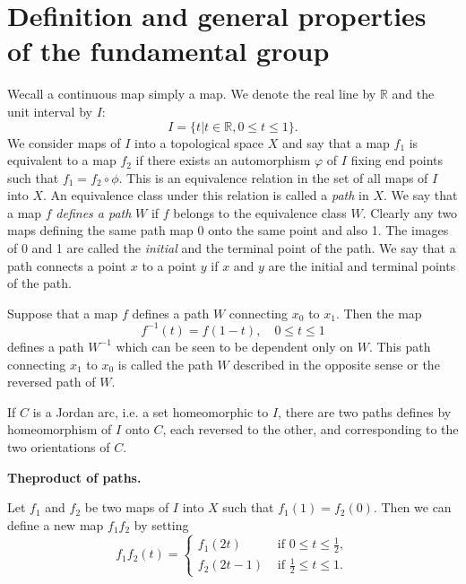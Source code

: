 \section{Definition and general properties of the fundamental
  group}\label{sec1} %

We\pageoriginale call a continuous map simply a map. We denote the
real line by $\mathbb{R}$ and the unit interval by $I$:  
$$
I= \{t|t \in \mathbb{R}, 0 \leq t \leq 1\}.
$$
We consider maps of $I$ into a topological space $X$ and say that a
map $f_1$ is equivalent to a map $f_2$ if there exists an automorphism
$\varphi$ of $I$ fixing end points such that $f_1=f_2 \circ  \phi$. This is an
equivalence relation in the set of all maps of $I$ into $X$. An
equivalence class under this relation is called a \textit{path} in
$X$. We say that a map $f$ \textit{defines a path} $W$ if $f$ belongs
to the equivalence class $W$. Clearly any two maps defining the same
path map 0 onto the same point and also 1. The images of 0 and 1
are called the \textit{initial} and the terminal point of the path. We
say that a path connects a point $x$ to a point $y$ if $x$ and $y$
are the initial and terminal points of the path. 

Suppose that a map $f$ defines a path $W$ connecting  $x_0$ to
$x_1$. Then the map 
$$
f^{-1}(t) = f(1-t),  \quad 0 \leq t \leq 1  
$$
defines a path $W^{-1}$ which can be seen to be dependent only on
$W$. This path connecting $x_1$ to $x_0$ is called the path $W$
described in the opposite sense or the reversed path of $W$. 

If $C$ is a Jordan arc, i.e. a set homeomorphic to $I$, there are two
paths defines by homeomorphism of $I$ onto $C$, each reversed to the
other, and corresponding to the two orientations of $C$.  

\medskip
\noindent
\textbf{The\pageoriginale product of paths.}

Let $f_1$ and $f_2$ be two maps of $I$ into $X$ such that
$f_1(1) = f_2(0)$. Then we can define a new map $f_1f_2$ by setting  
$$
f_1 f_2 (t)=
\begin{cases}
f_1 (2t) & \text { if } 0 \leq t \leq \frac{1}{2},\\
f_2 (2t-1) & \text { if }\frac{1}{2} \leq t \leq 1.
\end{cases}
$$

